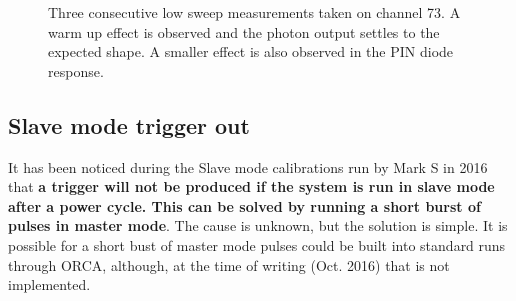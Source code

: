 \documentclass[12pt]{report}
\begin{document}
\begin{figure}[htp]
	\centering
	\newline
	\caption{Three consecutive low sweep measurements taken on channel 73. A warm up effect is observed and the photon output settles to the expected shape. A smaller effect is also observed in the PIN diode response.}
	\label{fig:DriverWarmUp} 
\end{figure}

\subsection{Slave mode trigger out}
It has been noticed during the Slave mode calibrations run by Mark S in 2016 that \textbf{a trigger will not be produced if the system is run in slave mode after a power cycle. This can be solved by running a short burst of pulses in master mode}. The cause is unknown, but the solution is simple. It is possible for a short bust of master mode pulses could be built into standard runs through ORCA, although, at the time of writing (Oct. 2016) that is not implemented. 
\end{document}
